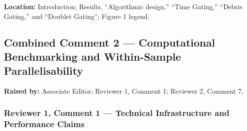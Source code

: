 \documentclass[
  11pt,
  a4paper,
]{article}
\begin{document}
\textbf{Location:} Introduction; Results, ``Algorithmic design,'' ``Time
Gating,'' ``Debris Gating,'' and ``Doublet Gating''; Figure 1 legend.

\subsection{Combined Comment 2 --- Computational Benchmarking and
Within-Sample
Parallelisability}\label{combined-comment-2--computational-benchmarking-and-within-sample-parallelisability}

\textbf{Raised by:} Associate Editor; Reviewer 1, Comment 1; Reviewer 2,
Comment 7.

\subsubsection{Reviewer 1, Comment 1 --- Technical Infrastructure and
Performance
Claims}\label{reviewer-1-comment-1--technical-infrastructure-and-performance-claims}
\end{document}
